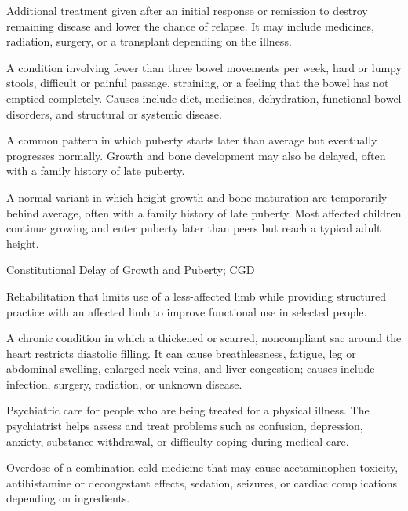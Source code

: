  Additional treatment given after an initial response or remission to destroy remaining disease and lower the chance of relapse. It may include medicines, radiation, surgery, or a transplant depending on the illness.

 A condition involving fewer than three bowel movements per week, hard or lumpy stools, difficult or painful passage, straining, or a feeling that the bowel has not emptied completely. Causes include diet, medicines, dehydration, functional bowel disorders, and structural or systemic disease.

 A common pattern in which puberty starts later than average but eventually progresses normally. Growth and bone development may also be delayed, often with a family history of late puberty.

 A normal variant in which height growth and bone maturation are temporarily behind average, often with a family history of late puberty. Most affected children continue growing and enter puberty later than peers but reach a typical adult height.


\synonyms
Constitutional Delay of Growth and Puberty; CGD

 Rehabilitation that limits use of a less-affected limb while providing structured practice with an affected limb to
improve functional use in selected people.

 A chronic condition in which a thickened or scarred, noncompliant sac around the heart restricts diastolic filling. It can cause breathlessness, fatigue, leg or abdominal swelling, enlarged neck veins, and liver congestion; causes include infection, surgery, radiation, or unknown disease.

 Psychiatric care for people who are being treated for a physical illness. The psychiatrist helps assess and treat problems such as confusion, depression, anxiety, substance withdrawal, or difficulty coping during medical care.

 Overdose of a combination cold medicine that may cause acetaminophen toxicity, antihistamine or decongestant effects, sedation, seizures, or cardiac complications depending on ingredients.

